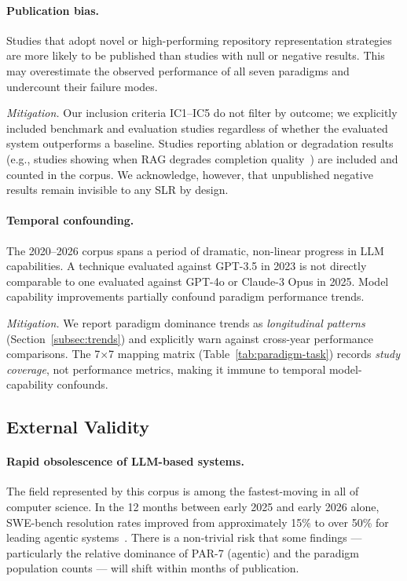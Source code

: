 \paragraph{Publication bias.}
Studies that adopt novel or high-performing repository representation
strategies are more likely to be published than studies with null or
negative results.
This may overestimate the observed performance of all seven paradigms and
undercount their failure modes.

\emph{Mitigation.}
Our inclusion criteria IC1--IC5 do not filter by outcome; we explicitly
included benchmark and evaluation studies regardless of whether the evaluated
system outperforms a baseline.
Studies reporting ablation or degradation results (e.g., studies showing when
RAG degrades completion quality~\cite{yang2025empirical}) are included and
counted in the corpus.
We acknowledge, however, that unpublished negative results remain invisible
to any SLR by design.

\paragraph{Temporal confounding.}
The 2020--2026 corpus spans a period of dramatic, non-linear progress in LLM
capabilities.
A technique evaluated against GPT-3.5 in 2023 is not directly comparable to
one evaluated against GPT-4o or Claude-3 Opus in 2025.
Model capability improvements partially confound paradigm performance trends.

\emph{Mitigation.}
We report paradigm dominance trends as \emph{longitudinal patterns}
(Section~\ref{subsec:trends}) and explicitly warn against cross-year
performance comparisons.
The 7$\times$7 mapping matrix (Table~\ref{tab:paradigm-task}) records
\emph{study coverage}, not performance metrics, making it immune to temporal
model-capability confounds.

\subsection{External Validity}
\label{subsec:threat-external}

\paragraph{Rapid obsolescence of LLM-based systems.}
The field represented by this corpus is among the fastest-moving in all of
computer science.
In the 12 months between early 2025 and early 2026 alone, SWE-bench
resolution rates improved from approximately 15\% to over 50\% for leading
agentic systems~\cite{zhang2025swebenchlive}.
There is a non-trivial risk that some findings — particularly the relative
dominance of PAR-7 (agentic) and the paradigm population counts — will shift
within months of publication.

